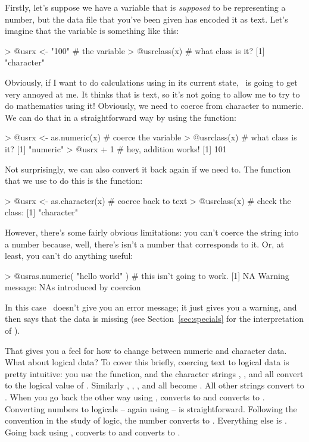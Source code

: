 Firstly, let's suppose we have a variable  that is {\it supposed} to be representing a number, but the data file that you've been given has encoded it as text. Let's imagine that the variable is something like this:
\begin{rblock1}
> @usr{x <- "100"}  # the variable 
> @usr{class(x)}    # what class is it?
[1] "character"
\end{rblock1}
Obviously, if I want to do calculations using  in its current state, \R\ is going to get very annoyed at me. It thinks that  is text, so it's not going to allow me to try to do mathematics using it! Obviously, we need to coerce  from character to numeric. We can do that in a straightforward way by using the  function: 
\begin{rblock1}
> @usr{x <- as.numeric(x)}  # coerce the variable
> @usr{class(x)}            # what class is it?
[1] "numeric"
> @usr{x + 1}               # hey, addition works!
[1] 101
\end{rblock1}
Not surprisingly, we can also convert it back again if we need to. The function that we use to do this is the  function:
\begin{rblock1}
> @usr{x <- as.character(x)}   # coerce back to text
> @usr{class(x)}               # check the class:
[1] "character"
\end{rblock1}
However, there's some fairly obvious limitations: you can't coerce the string  into a number because, well, there's isn't a number that corresponds to it. Or, at least, you can't do anything useful:
\begin{rblock1}
> @usr{as.numeric( "hello world" )}  # this isn't going to work.
[1] NA
Warning message:
NAs introduced by coercion
\end{rblock1}
In this case \R\ doesn't give you an error message; it just gives you a warning, and then says that the data is missing (see Section~\ref{sec:specials} for the interpretation of ). 

That gives you a feel for how to change between numeric and character data. What about logical data? To cover this briefly, coercing text to logical data is pretty intuitive: you use the  function, and the character strings , ,  and  all convert to the logical value of . Similarly , , , and  all become . All other strings convert to . When you go back the other way using ,  converts to  and  converts to . Converting numbers to logicals -- again using  -- is straightforward. Following the convention in the study of logic, the number  converts to . Everything else is . Going back using ,  converts to  and  converts to .


